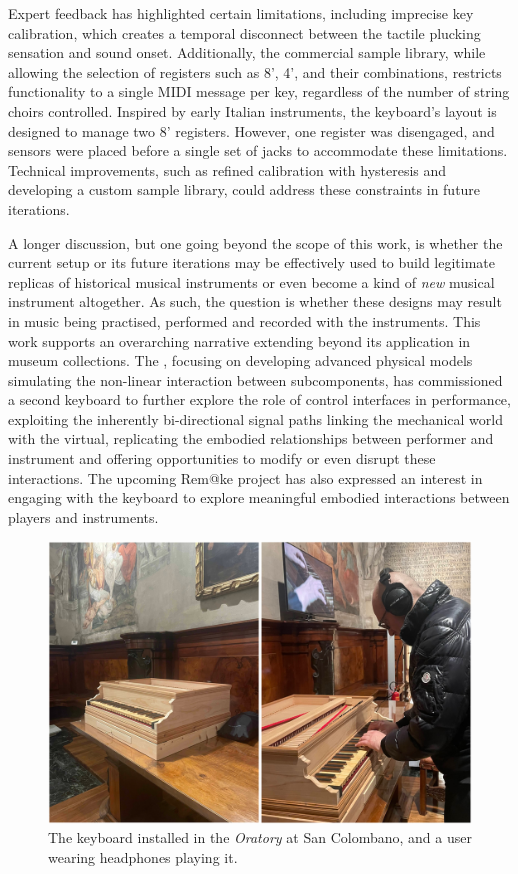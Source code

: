 Expert feedback has highlighted certain limitations, including imprecise key calibration, which creates a temporal disconnect between the tactile plucking sensation and sound onset. Additionally, the commercial sample library, while allowing the selection of registers such as 8', 4', and their combinations, restricts functionality to a single MIDI message per key, regardless of the number of string choirs controlled. Inspired by early Italian instruments, the keyboard's layout is designed to manage two 8' registers. However, one register was disengaged, and sensors were placed before a single set of jacks to accommodate these limitations. Technical improvements, such as refined calibration with hysteresis and developing a custom sample library, could address these constraints in future iterations.

A longer discussion, but one going beyond the scope of this work, is whether the current setup or its future iterations may be effectively used to build legitimate replicas of historical musical instruments or even become a kind of \emph{new} musical instrument altogether. As such, the question is whether these designs may result in music being practised, performed and recorded with the instruments. This work supports an overarching narrative extending beyond its application in museum collections. The , focusing on developing advanced physical models simulating the non-linear interaction between subcomponents, has commissioned a second keyboard to further explore the role of control interfaces in performance, exploiting the inherently bi-directional signal paths linking the mechanical world with the virtual, replicating the embodied relationships between performer and instrument and offering opportunities to modify or even disrupt these interactions. The upcoming Rem@ke project \cite{remake1} has also expressed an interest in engaging with the keyboard to explore meaningful embodied interactions between players and instruments. 

\begin{figure}
\centering
\includegraphics[width = \linewidth]{src/images/keyboardMuseum.JPEG}
\caption{The keyboard installed in the \emph{Oratory} at San Colombano, and a user wearing headphones playing it.}\label{fig:oratory}
\end{figure}


